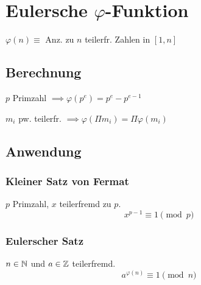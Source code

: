 \section*{Eulersche $\varphi$-Funktion}

$\varphi(n) \equiv$ Anz. zu $n$ teilerfr. Zahlen in $[1,n]$

\subsection*{Berechnung}
$p$ Primzahl $\implies \varphi(p^e)=p^e-p^{e-1}$

$m_i$ pw. teilerfr. $\implies \varphi(\Pi m_i)=\Pi\varphi(m_i)$

\subsection*{Anwendung}

\subsubsection*{Kleiner Satz von Fermat}
$p$ Primzahl, $x$ teilerfremd zu $p$.
\[x^{p-1} \equiv 1 \pmod{p}\]

\subsubsection*{Eulerscher Satz}
$n\in\mathbb{N}$ und $a\in\mathbb{Z}$ teilerfremd.
\[a^{\varphi(n)} \equiv 1 \pmod{n}\]
